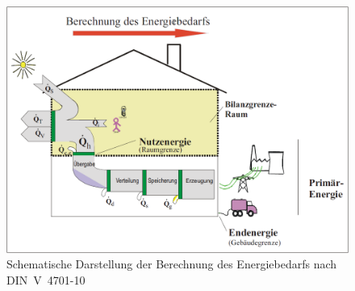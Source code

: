 \begin{figure}[H] \centering
	\centering
		\includegraphics{Pictures/DIN_V_4701_10.png}
	\caption{Schematische Darstellung der Berechnung des Energiebedarfs nach \mbox{DIN V 4701-10} \cite{DeutschesInstitutfurNormunge.V..082003}}
	\label{fig: Abbildung321} 
\end{figure}

